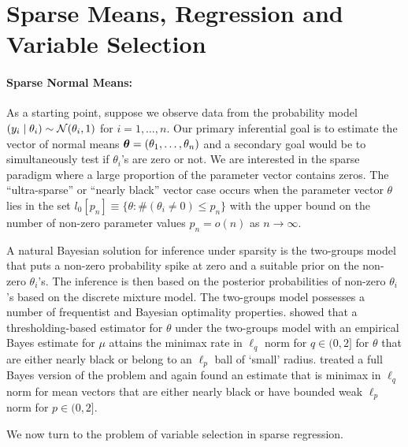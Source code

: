 \documentclass[11pt]{article}
\begin{document}
\section{Sparse Means, Regression and Variable Selection}

\paragraph{Sparse Normal Means:} As a starting point, suppose we observe data from the probability model $  (y_i \mid \theta_i)  \sim {\cal N} (\theta_i,1)$ for $i = 1, \ldots, n$. Our primary inferential goal is to estimate the vector of normal means $ \boldsymbol{\theta} = ( \theta_1, \ldots , \theta_n )$ and a secondary goal would be to simultaneously test if $\theta_i$'s are zero or not. We are interested in the sparse paradigm where a large proportion of the parameter vector contains zeros.  The ``ultra-sparse'' or ``nearly black'' vector case occurs when the parameter vector $\theta$ lies in the set $ l_0 [ p_n] \equiv \{ \theta : \# ( \theta_i \neq 0 ) \leq p_n \} $ with the upper bound on the number of non-zero parameter values $ p_n = o(n) $ as $ n \to \infty$. 

A natural Bayesian solution for inference under sparsity is the two-groups model that puts a non-zero probability spike at zero and a suitable prior on the non-zero $\theta_i$'s. The inference is then based on the posterior probabilities of non-zero $\theta_i$'s based on the discrete mixture model. The two-groups model possesses a number of frequentist and Bayesian optimality properties. \cite{johnstone2004needles} showed that a thresholding-based estimator for $\theta$ under the two-groups model with an empirical Bayes estimate for $\mu$ attains the minimax rate in $\ell_q$ norm for $q \in (0,2]$ for $\theta$ that are either nearly black or belong to an $\ell_p$ ball of `small' radius. \cite{castillo2012needles} treated a full Bayes version of the problem and again found an estimate that is minimax in $\ell_q$ norm for mean vectors that are either nearly black or have bounded weak $\ell_p$ norm for $p \in (0,2]$. 

We now turn to the problem of variable selection in sparse regression. 
\end{document}
